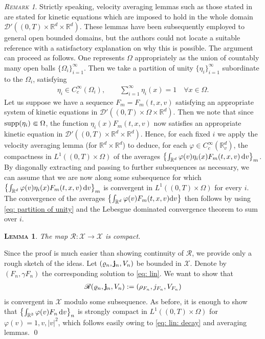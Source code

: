 \documentclass[10pt, reqno]{amsart}
\theoremstyle{plain}
\newtheorem{lemma}[theorem]{\normalfont \scshape Lemma}
\theoremstyle{definition}
\theoremstyle{remark}
\newtheorem{remark}[theorem]{\normalfont \scshape Remark}
\renewenvironment{proof}[1][\proofname]{\noindent{\scshape #1.\quad}}{\qed}
\numberwithin{equation}{section}
\newcommand{\bfj}{{\bf j}}
\newcommand{\calD}{\mathcal D}
\newcommand{\scrX}{\mathscr X}
\newcommand{\R}{\mathbb{R}}
\newcommand{\dv}{\textnormal{d}v}
\newcommand{\lt}{\left}
\newcommand{\rt}{\right}
\newcommand{\intr}{\int_{\R^d}}
\begin{document}
\begin{remark}
    Strictly speaking, velocity averaging lemmas such as those stated in \cite{DipernaLionsMeyer} are stated for kinetic equations which are imposed to hold in the whole domain $\calD'((0,T)\times \R^d \times \R^d)$. These lemmas have been subsequently employed to general open bounded domains, but the authors could not locate a suitable reference with a satisfactory explanation on why this is possible. The argument can proceed as follows. One represents $\Omega$ appropriately as the union of countably many open balls $\{\Omega_i\}_{i=1}^\infty$. Then we take a partition of unity $\{\eta_i\}_{i=1}^\infty$ subordinate to the $\Omega_i$, satisfying
    \begin{align}\label{eq: partition of unity}
        \eta_i \in C_c^\infty(\Omega_i), \qquad \sum_{i=1}^\infty \eta_i(x) = 1 \quad \forall x\in \Omega.
    \end{align}
    Let us suppose we have a sequence $F_m = F_m(t,x,v)$ satisfying an appropriate system of kinetic equations in $\calD'((0,T)\times\Omega\times\R^d)$. Then we note that since $\textnormal{supp}(\eta_i) \Subset \Omega$, the function $\eta_i(x) F_m(t,x,v)$ now satisfies an appropriate kinetic equation in $\calD'((0,T)\times \R^d \times \R^d)$. Hence, for each fixed $i$ we apply the velocity averaging lemma (for $\R^d\times \R^d$) to deduce, for each $\varphi\in C_c^\infty(\R^d_v)$, the compactness in $L^1((0,T)\times\Omega)$ of the averages $\lt\{ \intr \varphi(v) \eta_i(x) F_m(t,x,v)\,\dv\rt\}_m$. By diagonally extracting and passing to further subsequences as necessary, we can assume that we are now along some subsequence for which $\lt\{ \intr \varphi(v) \eta_i(x) F_m(t,x,v)\,\dv\rt\}_m$ is convergent in $L^1((0,T)\times\Omega)$ for every $i$. The convergence of the averages $\lt\{\intr \varphi(v) F_m(t,x,v)\dv\rt\}$ then follows by using \eqref{eq: partition of unity} and the Lebesgue dominated convergence theorem to sum over $i$.
\end{remark}


\begin{lemma}\label{lem: R comp}
    The map $\mathscr{R}:\scrX\to \scrX$ is compact.
\end{lemma}

\begin{proof}
    Since the proof is much easier than showing continuity of $\mathscr{R}$, we provide only a rough sketch of the ideas. Let $(\varrho_n, \bfj_n, V_n)$ be bounded in $\scrX$. Denote by $(F_n, \gamma F_n)$ the corresponding solution to \eqref{eq: lin}. We want to show that
    \begin{align*}
        \mathscr{R}(\varrho_n, \bfj_n, V_n) := (\rho_{F_n}, j_{F_n}, V_{F_n} )
    \end{align*}
    is convergent in $\scrX$ modulo some subsequence. As before, it is enough to show that $\left\{\int_{\R^3}\varphi(v) F_n\,\dv\right\}_n$ is strongly compact in $L^1((0,T)\times\Omega)$ for $\varphi(v) = 1,v,|v|^2$, which follows easily owing to \eqref{eq: lin: decay} and averaging lemmas.
\end{proof}
\end{document}
